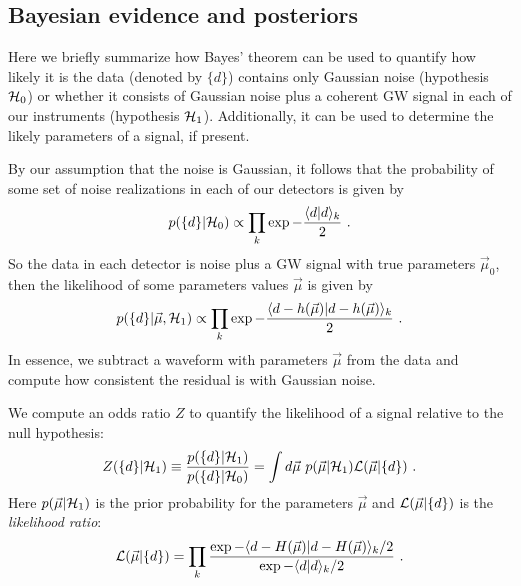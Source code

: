 \subsection{Bayesian evidence and posteriors}


Here we briefly summarize how Bayes' theorem can be used to quantify how likely it is the data 
(denoted by $\{d\}$) contains only Gaussian noise (hypothesis ${\cal H}_0$) 
or whether it consists of Gaussian noise plus a coherent GW signal in each of our instruments
(hypothesis ${\cal H}_1$). Additionally, it can be used to determine the likely parameters of a signal,
if present.

By our assumption that the noise is Gaussian, it follows that the probability of some set of noise
realizations in each of our detectors is given by
\begin{equation}
p(\{d\}|{\cal H}_0) \propto \prod_k \exp - \frac{ \langle d | d \rangle_k}{2}\ .
\end{equation}
So the data in each detector is noise plus a GW signal 
with true parameters $\vec{\mu}_0$, then the likelihood of some parameters values $\vec{\mu}$ is given by
\begin{equation}
p(\{d\}|\vec{\mu},{\cal H}_1) \propto \prod_k \exp - \frac{ \langle d - h(\vec{\mu}) | d - h(\vec{\mu}) \rangle_k }{2}\ .
\end{equation}
In essence, we subtract a waveform with parameters $\vec{\mu}$ from the data 
and compute how consistent the residual is with Gaussian noise.

We compute an odds ratio $Z$ to quantify the likelihood of a signal relative to the null hypothesis:
\begin{equation} \label{eq:def:Z:Modified}
Z(\{d\}|{\cal H}_1) \equiv \frac{p(\{d\}|{\cal H}_1)}{p(\{d\}|{\cal H}_0)} 
  = \int d\vec{\mu}\ p(\vec{\mu}|{\cal H}_1) \Like(\vec{\mu}|\{d\})\ .
\end{equation}
Here $p(\vec{\mu}|{\cal H}_1)$ is the prior probability for the parameters $\vec{\mu}$ and ${\cal L}(\vec{\mu}|\{d\})$
is the \emph{likelihood ratio}:
\begin{equation} \label{eq:likelihood}
{\cal L}(\vec{\mu}|\{d\}) = \prod_k \frac{\exp - \langle d - H(\vec{\mu}) | d - H(\vec{\mu}) \rangle_k / 2}
{\exp - \langle d | d \rangle_k / 2}\ .
\end{equation}

